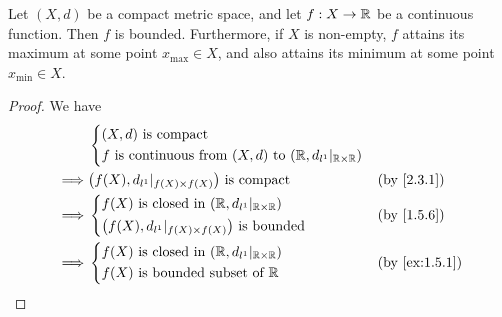 \begin{prop}\label{2.3.2}
  Let \((X, d)\) be a compact metric space, and let \(f : X \to \mathbb{R}\) be a continuous function.
  Then \(f\) is bounded.
  Furthermore, if \(X\) is non-empty, \(f\) attains its maximum at some point \(x_{\max} \in X\), and also attains its minimum at some point \(x_{\min} \in X\).
\end{prop}

\begin{proof}
  We have
  \begin{align*}
             & \begin{dcases}
                 (X, d) \text{ is compact} \\
                 f \text{ is continuous from } (X, d) \text{ to } (\R, d_{l^1}|_{\R \times \R})
               \end{dcases}                  \\
    \implies & \big(f(X), d_{l^1}|_{f(X) \times f(X)}\big) \text{ is compact}                 &  & \by{2.3.1} \\
    \implies & \begin{dcases}
                 f(X) \text{ is closed in } (\R, d_{l^1}|_{\R \times \R}) \\
                 \big(f(X), d_{l^1}|_{f(X) \times f(X)}\big) \text{ is bounded}
               \end{dcases}                 &  & \by{1.5.6}                                  \\
    \implies & \begin{dcases}
                 f(X) \text{ is closed in } (\R, d_{l^1}|_{\R \times \R}) \\
                 f(X) \text{ is bounded subset of } \R
               \end{dcases}                    &  & \text{(by \cref{ex:1.5.1})}
  \end{align*}


\end{proof}
